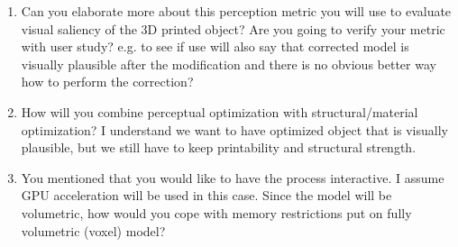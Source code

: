 \begin{enumerate}
	\item Can you elaborate more about this perception metric you will use to evaluate visual saliency of the 3D printed object? Are you going to verify your metric with user study? e.g. to see if use will also say that corrected model is visually plausible after the modification and there is no obvious better way how to perform the correction?
	
	\item How will you combine perceptual optimization with structural/material optimization? I understand we want to have optimized object that is visually plausible, but we still have to keep printability and structural strength.
	
	\item You mentioned that you would like to have the process interactive. I assume GPU acceleration will be used in this case. Since the model will be volumetric, how would you cope with memory restrictions put on fully volumetric (voxel) model?
	
\end{enumerate}